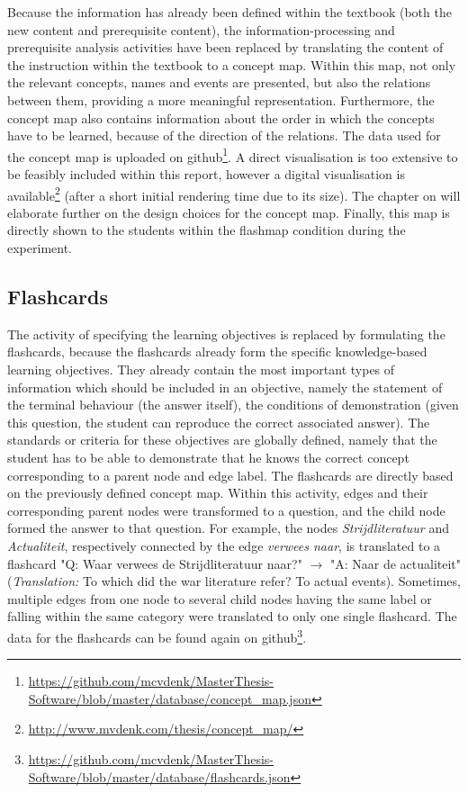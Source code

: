 Because the information has already been defined within the textbook (both the new content and prerequisite content), the information-processing and prerequisite analysis activities have been replaced by translating the content of the instruction within the textbook to a concept map. Within this map, not only the relevant concepts, names and events are presented, but also the relations between them, providing a more meaningful representation. Furthermore, the concept map also contains information about the order in which the concepts have to be learned, because of the direction of the relations. The data used for the concept map is uploaded on github\footnote{\url{https://github.com/mcvdenk/MasterThesis-Software/blob/master/database/concept_map.json}}. A direct visualisation is too extensive to be feasibly included within this report, however a digital visualisation is available\footnote{\url{http://www.mvdenk.com/thesis/concept_map/}} (after a short initial rendering time due to its size). The chapter on  will elaborate further on the design choices for the concept map. Finally, this map is directly shown to the students within the flashmap condition during the experiment.

\subsection{Flashcards}

The activity of specifying the learning objectives is replaced by formulating the flashcards, because the flashcards already form the specific knowledge-based learning objectives. They already contain the most important types of information which should be included in an objective, namely the statement of the terminal behaviour (the answer itself), the conditions of demonstration (given this question, the student can reproduce the correct associated answer). The standards or criteria for these objectives are globally defined, namely that the student has to be able to demonstrate that he knows the correct concept corresponding to a parent node and edge label. The flashcards are directly based on the previously defined concept map. Within this activity, edges and their corresponding parent nodes were transformed to a question, and the child node formed the answer to that question. For example, the nodes \emph{Strijdliteratuur} and \emph{Actualiteit}, respectively connected by the edge \emph{verwees naar}, is translated to a flashcard "Q: Waar verwees de Strijdliteratuur naar?" $\rightarrow$ "A: Naar de actualiteit" (\emph{Translation:} To which did the war literature refer? To actual events). Sometimes, multiple edges from one node to several child nodes having the same label or falling within the same category were translated to only one single flashcard. The data for the flashcards can be found again on github\footnote{\url{https://github.com/mcvdenk/MasterThesis-Software/blob/master/database/flashcards.json}}.

